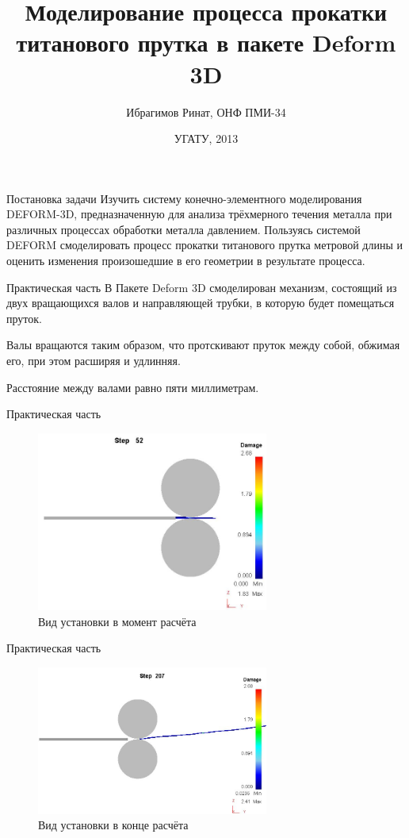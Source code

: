 \documentclass{beamer}
\begin{document}
\title{Моделирование процесса прокатки титанового прутка в пакете Deform 3D}  
\author{Ибрагимов Ринат, ОНФ ПМИ-34}
\date{УГАТУ, 2013}
\frame{\titlepage}
\begin{frame}{Постановка задачи}
Изучить систему конечно-элементного моделирования DEFORM-3D, предназначенную для анализа трёхмерного течения металла при различных процессах обработки металла давлением.
Пользуясь системой DEFORM смоделировать процесс прокатки титанового прутка метровой длины и оценить изменения произошедшие в его геометрии в результате процесса.
\end{frame}

\begin{frame}{Практическая часть}
В Пакете Deform 3D смоделирован механизм, состоящий из двух вращающихся валов и направляющей трубки, в которую будет помещаться пруток.

Валы вращаются таким образом, что протскивают пруток между собой, обжимая его, при этом расширяя и удлинняя.

Расстояние между валами равно пяти миллиметрам.
\end{frame}

\begin{frame}{Практическая часть}
\begin{figure}[h]
 \includegraphics[width=3in]{img/step52.JPG}
 \footnotesize\caption{Вид установки в момент расчёта}
\end{figure}
\end{frame}

\begin{frame}{Практическая часть}
\begin{figure}[h]
 \includegraphics[width=3in]{img/step207.JPG}
 \footnotesize\caption{Вид установки в конце расчёта}
\end{figure}
\end{frame}
\end{document}
